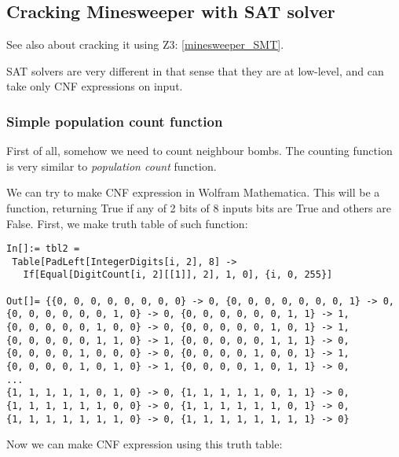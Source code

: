 \subsection{Cracking Minesweeper with SAT solver}
\label{minesweeper_SAT}

See also about cracking it using Z3: \ref{minesweeper_SMT}.

SAT solvers are very different in that sense that they are at low-level, and can take only CNF expressions on input.

\subsubsection{Simple population count function}

First of all, somehow we need to count neighbour bombs.
The counting function is very similar to \textit{population count} function.

We can try to make CNF expression in Wolfram Mathematica.
This will be a function, returning True if any of 2 bits of 8 inputs bits are True and others are False.
First, we make truth table of such function:

\begin{lstlisting}
In[]:= tbl2 = 
 Table[PadLeft[IntegerDigits[i, 2], 8] -> 
   If[Equal[DigitCount[i, 2][[1]], 2], 1, 0], {i, 0, 255}]

Out[]= {{0, 0, 0, 0, 0, 0, 0, 0} -> 0, {0, 0, 0, 0, 0, 0, 0, 1} -> 0, 
{0, 0, 0, 0, 0, 0, 1, 0} -> 0, {0, 0, 0, 0, 0, 0, 1, 1} -> 1, 
{0, 0, 0, 0, 0, 1, 0, 0} -> 0, {0, 0, 0, 0, 0, 1, 0, 1} -> 1, 
{0, 0, 0, 0, 0, 1, 1, 0} -> 1, {0, 0, 0, 0, 0, 1, 1, 1} -> 0, 
{0, 0, 0, 0, 1, 0, 0, 0} -> 0, {0, 0, 0, 0, 1, 0, 0, 1} -> 1, 
{0, 0, 0, 0, 1, 0, 1, 0} -> 1, {0, 0, 0, 0, 1, 0, 1, 1} -> 0, 
...
{1, 1, 1, 1, 1, 0, 1, 0} -> 0, {1, 1, 1, 1, 1, 0, 1, 1} -> 0, 
{1, 1, 1, 1, 1, 1, 0, 0} -> 0, {1, 1, 1, 1, 1, 1, 0, 1} -> 0, 
{1, 1, 1, 1, 1, 1, 1, 0} -> 0, {1, 1, 1, 1, 1, 1, 1, 1} -> 0}
\end{lstlisting}

Now we can make CNF expression using this truth table:

